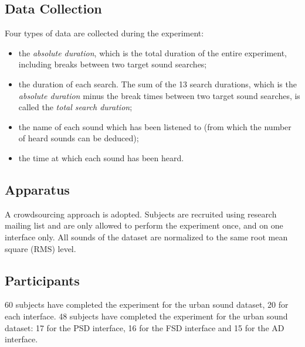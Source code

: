 \documentclass{aes2e}
\begin{document}
\subsection{Data Collection}
Four types of data are collected during the experiment:
\begin{itemize}
\item the \textit{absolute duration}, which is the total duration of the entire experiment, including breaks between two target sound searches;
\item the duration of each search. The sum of the 13 search durations, which is the \textit{absolute duration} minus the break times between two target sound searches, is called the \textit{total search duration};
\item the name of each sound which has been listened to (from which the number of heard sounds can be deduced);
\item the time at which each sound has been heard.  
\end{itemize}

\subsection{Apparatus}

A crowdsourcing approach is adopted. 
Subjects are recruited using research mailing list and are only allowed to perform the experiment once, and on one interface only. %
All sounds of the dataset are normalized to the same root mean square (RMS) level.


\subsection{Participants}

60 subjects have completed the experiment for the urban sound dataset, 20 for each interface. 48 subjects have completed the experiment for the urban sound dataset: 17 for the PSD interface, 16 for the FSD interface and 15 for the AD interface.
\end{document}
